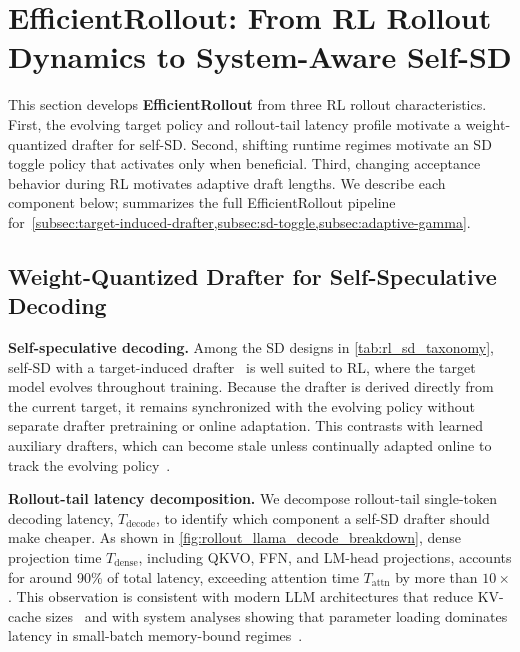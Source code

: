 \documentclass{llmxive}
\providecommand{\methodtitle}{EfficientRollout}
\providecommand{\Tdecode}{T_{\mathrm{decode}}}
\providecommand{\Tdense}{T_{\mathrm{dense}}}
\providecommand{\Tattn}{T_{\mathrm{attn}}}
\begin{document}
\section{{\methodtitle{}: From RL Rollout Dynamics to System-Aware Self-SD}}
\label{sec:method}

This section develops \textbf{\methodtitle{}} from three RL rollout characteristics.
First, the evolving target policy and rollout-tail latency profile motivate a weight-quantized drafter for self-SD.
Second, shifting runtime regimes motivate an SD toggle policy that activates only when beneficial.
Third, changing acceptance behavior during RL motivates adaptive draft lengths.
We describe each component below;  summarizes the full \methodtitle{} pipeline for~\cref{subsec:target-induced-drafter,subsec:sd-toggle,subsec:adaptive-gamma}.

\subsection{Weight-Quantized Drafter for Self-Speculative Decoding}
\label{subsec:target-induced-drafter}

\textbf{Self-speculative decoding.}
Among the SD designs in \cref{tab:rl_sd_taxonomy}, self-SD with a target-induced drafter~\citep{zhang2024draft,yue2026specattn,tiwari2025quantspec} is well suited to RL, where the target model evolves throughout training.
Because the drafter is derived directly from the current target, it remains synchronized with the evolving policy without separate drafter pretraining or online adaptation.
This contrasts with learned auxiliary drafters, which can become stale unless continually adapted online to track the evolving policy~\citep{zhang2025fastgrpo}.


\textbf{Rollout-tail latency decomposition.}
We decompose rollout-tail single-token decoding latency, $\Tdecode$, to identify which component a self-SD drafter should make cheaper.
As shown in \cref{fig:rollout_llama_decode_breakdown}, dense projection time $\Tdense$, including QKVO, FFN, and LM-head projections, accounts for around 90\% of total latency, exceeding attention time $\Tattn$ by more than $10\times$.
This observation is consistent with modern LLM architectures that reduce KV-cache sizes~\citep{shazeer2019fast,ainslie2023gqa,liu2024deepseek,guo2025deepseek} and with system analyses showing that parameter loading dominates latency in small-batch memory-bound regimes~\citep{sadhukhan2024magicdec}.
\end{document}

